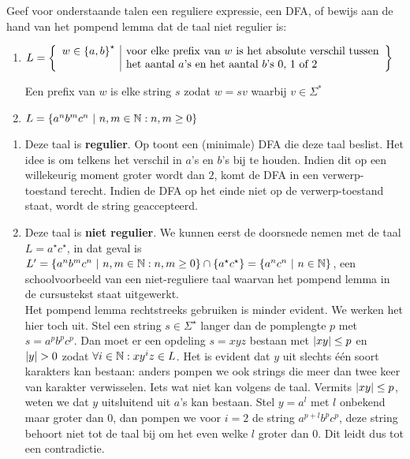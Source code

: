 \documentclass{article}
\begin{document}
\begin{question}
Geef voor onderstaande talen een reguliere expressie, een DFA, of
bewijs aan de hand van het pompend lemma dat de taal niet regulier is:
\begin{enumerate}
 \item $L=\left\{ \begin{array}{l|l}w\in\left\{ a,b \right\}^{\star}&\mbox{voor
elke prefix van $w$ is het absolute verschil tussen}\\&\mbox{het
aantal $a$'s en het aantal $b$'s 0, 1 of 2}\end{array} \right\}$

Een prefix van $w$ is elke string $s$ zodat $w = sv$ waarbij $v \in \Sigma^*$
 \item $L=\left\{ a^nb^mc^n\ |\ n,m\in\mathbb{N}:n,m\geq 0 \right\}$
\end{enumerate}
\begin{answer}
\begin{enumerate}
 \item Deze taal is \textbf{regulier}. Op  toont een (minimale) DFA die deze taal beslist. Het idee is om telkens het verschil in $a$'s en $b$'s bij te houden. Indien dit op een willekeurig moment groter wordt dan $2$, komt de DFA in een verwerp-toestand terecht. Indien de DFA op het einde niet op de verwerp-toestand staat, wordt de string geaccepteerd.
 \item Deze taal is \textbf{niet regulier}. We kunnen eerst de doorsnede nemen met de taal $L=a^{\star}c^{\star}$, in dat geval is $L'=\left\{ a^nb^mc^n\ |\ n,m\in\mathbb{N}:n,m\geq 0 \right\}\cap\left\{ a^{\star}c^{\star} \right\}=\left\{ a^nc^n\ |\ n\in\mathbb{N} \right\}$, een schoolvoorbeeld van een niet-reguliere taal waarvan het pompend lemma in de cursustekst staat uitgewerkt.\\
 Het pompend lemma rechtstreeks gebruiken is minder evident. We werken het hier toch uit. Stel een string $s\in\Sigma^{\star}$ langer dan de pomplengte $p$ met $s=a^pb^pc^p$. Dan moet er een opdeling $s=xyz$ bestaan met $\left|xy\right|\leq p$ en $\abs{y}>0$ zodat $\forall i\in\mathbb{N}:xy^iz\in L$. Het is evident dat $y$ uit slechts \'e\'en soort karakters kan bestaan: anders pompen we ook strings die meer dan twee keer van karakter verwisselen. Iets wat niet kan volgens de taal. Vermits $\left|xy\right|\leq p$, weten we dat $y$ uitsluitend uit $a$'s kan bestaan. Stel $y=a^l$ met $l$ onbekend maar groter dan $0$, dan pompen we voor $i=2$ de string $a^{p+l}b^pc^p$, deze string behoort niet tot de taal bij om het even welke $l$ groter dan $0$. Dit leidt dus tot een contradictie.
\end{enumerate}
\end{answer}
\end{question}
\end{document}
